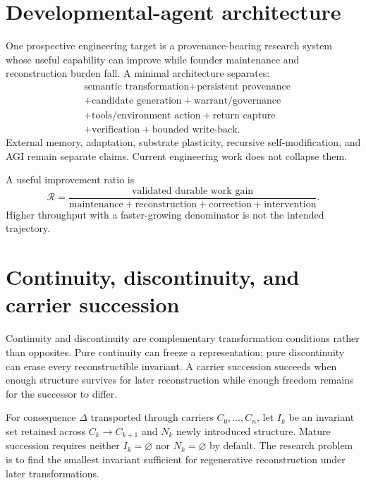 \section{Developmental-agent architecture}

One prospective engineering target is a provenance-bearing research system whose useful capability can improve while founder maintenance and reconstruction burden fall. A minimal architecture separates:
\begin{equation}
\begin{aligned}
&\text{semantic transformation}+\text{persistent provenance}\nonumber\\
&+\text{candidate generation}+\text{warrant/governance}\nonumber\\
&+\text{tools/environment action}+\text{return capture}\nonumber\\
&+\text{verification}+\text{bounded write-back}.
\end{aligned}
\end{equation}
External memory, adaptation, substrate plasticity, recursive self-modification, and AGI remain separate claims. Current engineering work does not collapse them.

A useful improvement ratio is
\begin{equation}
\mathcal{R}=\frac{\text{validated durable work gain}}
{\text{maintenance}+\text{reconstruction}+\text{correction}+\text{intervention}}.
\end{equation}
Higher throughput with a faster-growing denominator is not the intended trajectory.

\section{Continuity, discontinuity, and carrier succession}
\label{sec:deep-continuity}

Continuity and discontinuity are complementary transformation conditions rather than opposites. Pure continuity can freeze a representation; pure discontinuity can erase every reconstructible invariant. A carrier succession succeeds when enough structure survives for later reconstruction while enough freedom remains for the successor to differ.

For consequence $\Delta$ transported through carriers $C_0,\ldots,C_n$, let $I_k$ be an invariant set retained across $C_k\rightarrow C_{k+1}$ and $N_k$ newly introduced structure. Mature succession requires neither $I_k=\varnothing$ nor $N_k=\varnothing$ by default. The research problem is to find the smallest invariant sufficient for regenerative reconstruction under later transformations.

